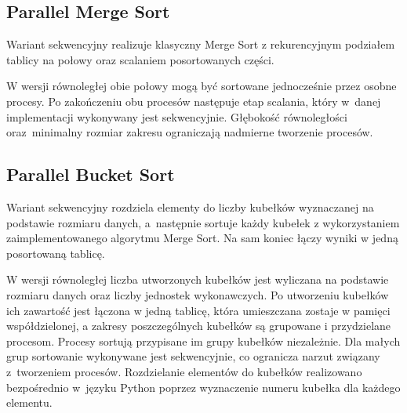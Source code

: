 

\subsection*{Parallel Merge Sort}

Wariant sekwencyjny realizuje klasyczny Merge Sort z rekurencyjnym podziałem tablicy na połowy oraz scalaniem posortowanych części.



W wersji równoległej obie połowy mogą być sortowane jednocześnie przez osobne procesy. 
Po zakończeniu obu procesów następuje etap scalania, który w~danej implementacji wykonywany jest sekwencyjnie. 
Głębokość równoległości oraz~minimalny rozmiar zakresu ograniczają nadmierne tworzenie procesów.



\subsection*{Parallel Bucket Sort}

Wariant sekwencyjny rozdziela elementy do liczby kubełków wyznaczanej na podstawie rozmiaru danych, a~następnie 
sortuje każdy kubełek z wykorzystaniem zaimplementowanego algorytmu Merge Sort. Na sam koniec łączy wyniki w jedną posortowaną tablicę.



W wersji równoległej liczba utworzonych kubełków jest wyliczana na podstawie rozmiaru danych oraz liczby jednostek wykonawczych. 
Po utworzeniu kubełków ich zawartość jest łączona w jedną tablicę, która umieszczana zostaje w pamięci współdzielonej, 
a zakresy poszczególnych kubełków są grupowane i przydzielane procesom. Procesy sortują przypisane im grupy kubełków niezależnie. 
Dla małych grup sortowanie wykonywane jest sekwencyjnie, co ogranicza narzut związany z~tworzeniem procesów.
Rozdzielanie elementów do kubełków realizowano bezpośrednio w~języku Python poprzez wyznaczenie numeru kubełka dla każdego elementu.


